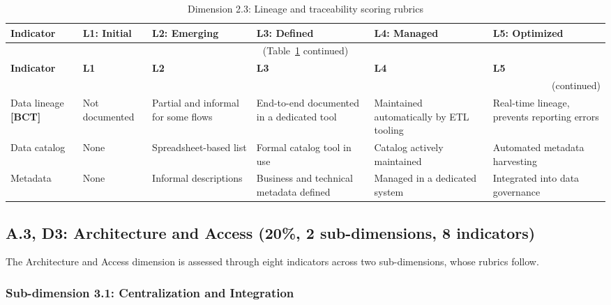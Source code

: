 \begin{center}
{\small
\begin{longtable}{|p{2.4cm}|p{2.0cm}|p{2.0cm}|p{2.2cm}|p{2.2cm}|p{2.2cm}|}
\caption{Dimension 2.3: Lineage and traceability scoring rubrics}\label{tab:d2-3}\\

\hline
\textbf{Indicator} & \textbf{L1: Initial} & \textbf{L2: Emerging} & \textbf{L3: Defined} & \textbf{L4: Managed} & \textbf{L5: Optimized} \\
\hline
\endfirsthead
\multicolumn{6}{c}{\small (Table~\ref{tab:d2-3} continued)} \\
\hline
\textbf{Indicator} & \textbf{L1} & \textbf{L2} & \textbf{L3} & \textbf{L4} & \textbf{L5} \\
\hline
\endhead
\hline
\multicolumn{6}{r}{\small (continued)} \\
\endfoot
\hline
\endlastfoot
Data lineage \textbf{[BCT]} &
  Not documented &
  Partial and informal for some flows &
  End-to-end documented in a dedicated tool &
  Maintained automatically by ETL tooling &
  Real-time lineage, prevents reporting errors \\
\hline
Data catalog &
  None &
  Spreadsheet-based list &
  Formal catalog tool in use &
  Catalog actively maintained &
  Automated metadata harvesting \\
\hline
Metadata &
  None &
  Informal descriptions &
  Business and technical metadata defined &
  Managed in a dedicated system &
  Integrated into data governance \\
\hline
\end{longtable}
}
\end{center}


\subsection*{A.3, D3: Architecture and Access (20\%, 2 sub-dimensions, 8 indicators)}

The Architecture and Access dimension is assessed through eight indicators across two sub-dimensions, whose rubrics follow.

\subsubsection*{Sub-dimension 3.1: Centralization and Integration}

